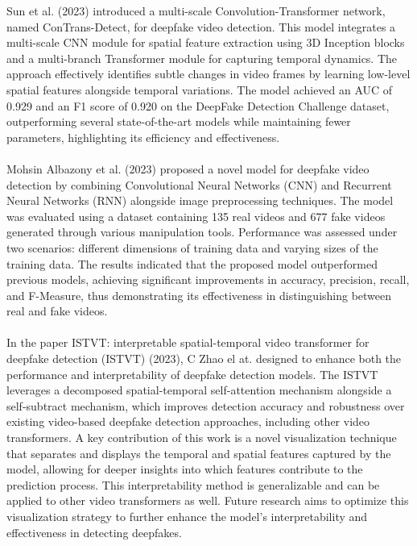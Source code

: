 Sun et al. (2023)\cite{df06} introduced a multi-scale Convolution-Transformer network, named ConTrans-Detect, for deepfake video detection. This model integrates a multi-scale CNN module for spatial feature extraction using 3D Inception blocks and a multi-branch Transformer module for capturing temporal dynamics. The approach effectively identifies subtle changes in video frames by learning low-level spatial features alongside temporal variations. The model achieved an AUC of 0.929 and an F1 score of 0.920 on the DeepFake Detection Challenge dataset, outperforming several state-of-the-art models while maintaining fewer parameters, highlighting its efficiency and effectiveness.\\\\
Mohsin Albazony et al. (2023)\cite{df08} proposed a novel model for deepfake video detection by combining Convolutional Neural Networks (CNN) and Recurrent Neural Networks (RNN) alongside image preprocessing techniques. The model was evaluated using a dataset containing 135 real videos and 677 fake videos generated through various manipulation tools. Performance was assessed under two scenarios: different dimensions of training data and varying sizes of the training data. The results indicated that the proposed model outperformed previous models, achieving significant improvements in accuracy, precision, recall, and F-Measure, thus demonstrating its effectiveness in distinguishing between real and fake videos.\\\\
In the paper ISTVT: interpretable spatial-temporal video transformer for deepfake detection (ISTVT) (2023), C Zhao el at. \cite{df11} designed to enhance both the performance and interpretability of deepfake detection models. The ISTVT leverages a decomposed spatial-temporal self-attention mechanism alongside a self-subtract mechanism, which improves detection accuracy and robustness over existing video-based deepfake detection approaches, including other video transformers. A key contribution of this work is a novel visualization technique that separates and displays the temporal and spatial features captured by the model, allowing for deeper insights into which features contribute to the prediction process. This interpretability method is
generalizable and can be applied to other video transformers as well. Future research aims to optimize this visualization strategy to further enhance the model's interpretability and effectiveness in detecting deepfakes.
